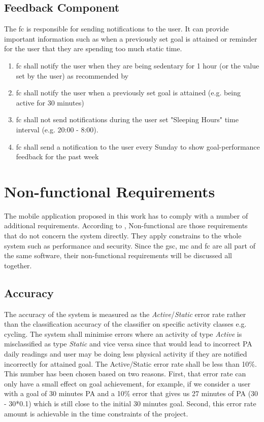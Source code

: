     \subsection{Feedback Component}
    \label{section:feedback-component}
    The \gls{fc} is responsible for sending notifications to the user. It can provide important information such as when a previously set goal is attained or reminder for the user that they are spending too much static time.
    \begin{enumerate}
        \item \gls{fc} shall notify the user when they are being sedentary for 1 hour (or the value set by the user) as recommended by \citet[]{swartz2011}
        
        \item \gls{fc} shall notify the user when a previously set goal is attained (e.g. being active for 30 minutes)
        
        \item \gls{fc} shall not send notifications during the user set "Sleeping Hours" time interval (e.g. 20:00 - 8:00).
        
        \item \gls{fc} shall send a notification to the user every Sunday to show goal-performance feedback for the past week
           
    \end{enumerate}

\section{Non-functional Requirements}
The mobile application proposed in this work has to comply with a number of additional requirements. According to \citet[87]{sommerville2010}, Non-functional are those requirements that do not concern the system directly. They apply constrains to the whole system such as performance and security.  Since the \gls{gsc}, \gls{mc} and \gls{fc} are all part of the same software, their non-functional requirements will be discussed all together.
    
    \subsection{Accuracy}
    The accuracy of the system is measured as the \textit{Active}/\textit{Static} error rate rather than  the classification accuracy of the classifier on specific activity classes e.g. cycling. The system shall minimise errors where an activity of type \textit{Active} is misclassified as type \textit{Static} and vice versa since that would lead to incorrect PA daily readings and user may be doing less physical activity if they are notified incorrectly for attained goal.  The Active/Static error rate shall be less than 10\%. This number has been chosen based on two reasons. First, that error rate can only have a small effect on goal achievement,  for example, if we consider a user with a goal of 30 minutes PA and a 10\% error that gives us 27 minutes of PA (30 - 30*0.1) which is still close to the initial 30 minutes goal. Second, this error rate amount is achievable in the time constraints of the project.
    
